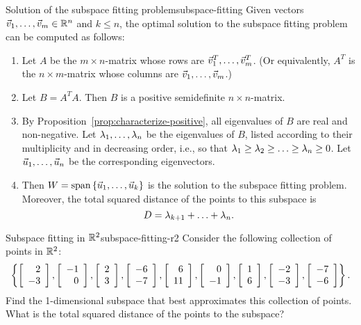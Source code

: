 \documentclass{ximera}
\begin{document}
\begin{proposition}{Solution of the subspace fitting problem}{subspace-fitting}
  Given vectors $\vect{v}_1,\ldots,\vect{v}_m\in\R^n$ and $k\leq n$,
  the optimal solution to the subspace fitting problem can be computed
  as follows:
  \begin{enumerate}
  \item Let $A$ be the $m\times n$-matrix whose rows are
    $\vect{v}_1^T,\ldots,\vect{v}_m^T$. (Or equivalently, $A^T$ is the
    $n\times m$-matrix whose columns are
    $\vect{v}_1,\ldots,\vect{v}_m$.)
  \item Let $B=A^TA$. Then $B$ is a positive semidefinite
    $n\times n$-matrix.
  \item By Proposition~\ref{prop:characterize-positive}, all
    eigenvalues of $B$ are real and non-negative. Let
    $\eigenvar_1,\ldots,\eigenvar_n$ be the eigenvalues of $B$, listed
    according to their multiplicity and in decreasing order, i.e., so
    that $\eigenvar_1\geq\eigenvar_2\geq\ldots\geq\eigenvar_n\geq
    0$. Let $\vect{u}_1,\ldots,\vect{u}_n$ be the corresponding
    eigenvectors.
  \item Then $W=\sspan\set{\vect{u}_1,\ldots,\vect{u}_k}$ is the
    solution to the subspace fitting problem.  Moreover, the total
    squared distance of the points to this subspace is
    \begin{equation*}
      D = \eigenvar_{k+1} + \ldots + \eigenvar_n.
    \end{equation*}
  \end{enumerate}
\end{proposition}

\begin{example}{Subspace fitting in $\R^2$}{subspace-fitting-r2}
  Consider the following collection of points in $\R^2$:
  \begin{equation*}
    \set{
      \startmat{r}  2 \\ -3 \stopmat,
      \startmat{r} -1 \\  0 \stopmat,
      \startmat{r}  2 \\  3 \stopmat,
      \startmat{r} -6 \\ -7 \stopmat,
      \startmat{r}  6 \\ 11 \stopmat,
      \startmat{r}  0 \\ -1 \stopmat,
      \startmat{r}  1 \\  6 \stopmat,
      \startmat{r} -2 \\ -3 \stopmat,
      \startmat{r} -7 \\ -6 \stopmat
    }.
  \end{equation*}
  Find the 1-dimensional subspace that best approximates this
  collection of points. What is the total squared distance of the
  points to the subspace?
\end{example}
\end{document}
